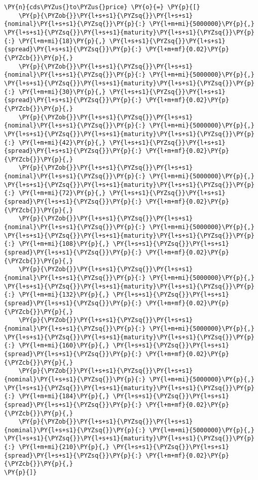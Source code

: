 \begin{Answer}
\begin{tcolorbox}[breakable, size=fbox, boxrule=1pt, pad at break*=1mm,colback=cellbackground, colframe=cellborder]
\begin{Verbatim}[commandchars=\\\{\}]
\PY{n}{cds\PYZus{}to\PYZus{}price} \PY{o}{=} \PY{p}{[}
    \PY{p}{\PYZob{}}\PY{l+s+s1}{\PYZsq{}}\PY{l+s+s1}{nominal}\PY{l+s+s1}{\PYZsq{}}\PY{p}{:} \PY{l+m+mi}{5000000}\PY{p}{,} \PY{l+s+s1}{\PYZsq{}}\PY{l+s+s1}{maturity}\PY{l+s+s1}{\PYZsq{}}\PY{p}{:} \PY{l+m+mi}{18}\PY{p}{,} \PY{l+s+s1}{\PYZsq{}}\PY{l+s+s1}{spread}\PY{l+s+s1}{\PYZsq{}}\PY{p}{:} \PY{l+m+mf}{0.02}\PY{p}{\PYZcb{}}\PY{p}{,}
    \PY{p}{\PYZob{}}\PY{l+s+s1}{\PYZsq{}}\PY{l+s+s1}{nominal}\PY{l+s+s1}{\PYZsq{}}\PY{p}{:} \PY{l+m+mi}{5000000}\PY{p}{,} \PY{l+s+s1}{\PYZsq{}}\PY{l+s+s1}{maturity}\PY{l+s+s1}{\PYZsq{}}\PY{p}{:} \PY{l+m+mi}{30}\PY{p}{,} \PY{l+s+s1}{\PYZsq{}}\PY{l+s+s1}{spread}\PY{l+s+s1}{\PYZsq{}}\PY{p}{:} \PY{l+m+mf}{0.02}\PY{p}{\PYZcb{}}\PY{p}{,}
    \PY{p}{\PYZob{}}\PY{l+s+s1}{\PYZsq{}}\PY{l+s+s1}{nominal}\PY{l+s+s1}{\PYZsq{}}\PY{p}{:} \PY{l+m+mi}{5000000}\PY{p}{,} \PY{l+s+s1}{\PYZsq{}}\PY{l+s+s1}{maturity}\PY{l+s+s1}{\PYZsq{}}\PY{p}{:} \PY{l+m+mi}{42}\PY{p}{,} \PY{l+s+s1}{\PYZsq{}}\PY{l+s+s1}{spread}\PY{l+s+s1}{\PYZsq{}}\PY{p}{:} \PY{l+m+mf}{0.02}\PY{p}{\PYZcb{}}\PY{p}{,}
    \PY{p}{\PYZob{}}\PY{l+s+s1}{\PYZsq{}}\PY{l+s+s1}{nominal}\PY{l+s+s1}{\PYZsq{}}\PY{p}{:} \PY{l+m+mi}{5000000}\PY{p}{,} \PY{l+s+s1}{\PYZsq{}}\PY{l+s+s1}{maturity}\PY{l+s+s1}{\PYZsq{}}\PY{p}{:} \PY{l+m+mi}{72}\PY{p}{,} \PY{l+s+s1}{\PYZsq{}}\PY{l+s+s1}{spread}\PY{l+s+s1}{\PYZsq{}}\PY{p}{:} \PY{l+m+mf}{0.02}\PY{p}{\PYZcb{}}\PY{p}{,}
    \PY{p}{\PYZob{}}\PY{l+s+s1}{\PYZsq{}}\PY{l+s+s1}{nominal}\PY{l+s+s1}{\PYZsq{}}\PY{p}{:} \PY{l+m+mi}{5000000}\PY{p}{,} \PY{l+s+s1}{\PYZsq{}}\PY{l+s+s1}{maturity}\PY{l+s+s1}{\PYZsq{}}\PY{p}{:} \PY{l+m+mi}{108}\PY{p}{,} \PY{l+s+s1}{\PYZsq{}}\PY{l+s+s1}{spread}\PY{l+s+s1}{\PYZsq{}}\PY{p}{:} \PY{l+m+mf}{0.02}\PY{p}{\PYZcb{}}\PY{p}{,}
    \PY{p}{\PYZob{}}\PY{l+s+s1}{\PYZsq{}}\PY{l+s+s1}{nominal}\PY{l+s+s1}{\PYZsq{}}\PY{p}{:} \PY{l+m+mi}{5000000}\PY{p}{,} \PY{l+s+s1}{\PYZsq{}}\PY{l+s+s1}{maturity}\PY{l+s+s1}{\PYZsq{}}\PY{p}{:} \PY{l+m+mi}{132}\PY{p}{,} \PY{l+s+s1}{\PYZsq{}}\PY{l+s+s1}{spread}\PY{l+s+s1}{\PYZsq{}}\PY{p}{:} \PY{l+m+mf}{0.02}\PY{p}{\PYZcb{}}\PY{p}{,}
    \PY{p}{\PYZob{}}\PY{l+s+s1}{\PYZsq{}}\PY{l+s+s1}{nominal}\PY{l+s+s1}{\PYZsq{}}\PY{p}{:} \PY{l+m+mi}{5000000}\PY{p}{,} \PY{l+s+s1}{\PYZsq{}}\PY{l+s+s1}{maturity}\PY{l+s+s1}{\PYZsq{}}\PY{p}{:} \PY{l+m+mi}{160}\PY{p}{,} \PY{l+s+s1}{\PYZsq{}}\PY{l+s+s1}{spread}\PY{l+s+s1}{\PYZsq{}}\PY{p}{:} \PY{l+m+mf}{0.02}\PY{p}{\PYZcb{}}\PY{p}{,}
    \PY{p}{\PYZob{}}\PY{l+s+s1}{\PYZsq{}}\PY{l+s+s1}{nominal}\PY{l+s+s1}{\PYZsq{}}\PY{p}{:} \PY{l+m+mi}{5000000}\PY{p}{,} \PY{l+s+s1}{\PYZsq{}}\PY{l+s+s1}{maturity}\PY{l+s+s1}{\PYZsq{}}\PY{p}{:} \PY{l+m+mi}{184}\PY{p}{,} \PY{l+s+s1}{\PYZsq{}}\PY{l+s+s1}{spread}\PY{l+s+s1}{\PYZsq{}}\PY{p}{:} \PY{l+m+mf}{0.02}\PY{p}{\PYZcb{}}\PY{p}{,}
    \PY{p}{\PYZob{}}\PY{l+s+s1}{\PYZsq{}}\PY{l+s+s1}{nominal}\PY{l+s+s1}{\PYZsq{}}\PY{p}{:} \PY{l+m+mi}{5000000}\PY{p}{,} \PY{l+s+s1}{\PYZsq{}}\PY{l+s+s1}{maturity}\PY{l+s+s1}{\PYZsq{}}\PY{p}{:} \PY{l+m+mi}{210}\PY{p}{,} \PY{l+s+s1}{\PYZsq{}}\PY{l+s+s1}{spread}\PY{l+s+s1}{\PYZsq{}}\PY{p}{:} \PY{l+m+mf}{0.02}\PY{p}{\PYZcb{}}\PY{p}{,}
\PY{p}{]}


\end{Verbatim}
\end{tcolorbox}
\end{Answer}
